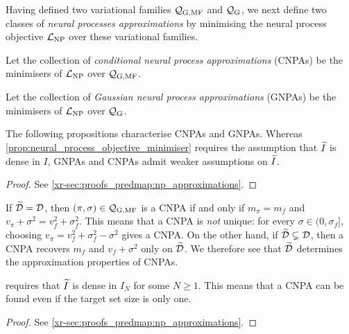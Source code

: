 \documentclass[12pt, twoside]{report}
\newcommand{\xrprefix}[1]{xr-#1}
\begin{document}
Having defined two variational families $\Qc\ss{G,MF}$ and $\Qc\ss{G}$, we next define two classes of \emph{neural processes approximations} by minimising the neural process objective $\L\ss{NP}$ over these variational families.

\begin{definition}
    \label{def:cnpa}
    Let the collection of \emph{conditional neural process approximations} (CNPAs)
    be the minimisers of $\L\ss{NP}$ over $\Qc\ss{G,MF}$.
\end{definition}

\begin{definition}
    \label{def:gnpa}
    Let the collection of \emph{Gaussian neural process approximations} (GNPAs)
    be the minimisers of $\L\ss{NP}$ over $\Qc\ss{G}$.
\end{definition}

The following propositions characterise CNPAs and GNPAs.
Whereas \cref{prop:neural_process_objective_minimiser} requires the assumption that $\widetilde{I}$ is dense in $I$, GNPAs and CNPAs admit weaker assumptions on $\widetilde{I}$.

\begin{proof}
    See \cref{\xrprefix{sec:proofs_predmap:np_approximations}}.
\end{proof}

If $\widetilde{\mathcal{D}} = \mathcal{D}$, then $(\pi, \sigma) \in \Qc\ss{G,MF}$ is a CNPA if and only if $m_{\pi} = m_f$ and $v_{\pi} + \sigma^2 = v_f^2 + \sigma_f^2$.
This means that a CNPA is \emph{not} unique:
for every $\sigma \in (0, \sigma_f]$, choosing $v_{\pi}= v_f^2 + \sigma_f^2 - \sigma^2$ gives a CNPA.
On the other hand, if $\widetilde{\mathcal{D}} \subsetneq \mathcal{D}$, then a CNPA recovers $m_f$ and $v_f + \sigma^2$ only on $\widetilde{\mathcal{D}}$.
We therefore see that $\widetilde{\mathcal{D}}$ determines the approximation properties of CNPAs.

 requires that $\widetilde{I}$ is dense in $I_N$ for some $N \ge 1$.
This means that a CNPA can be found even if the target set size is only one.

\begin{proof}
    See \cref{\xrprefix{sec:proofs_predmap:np_approximations}}.
\end{proof}
\end{document}
